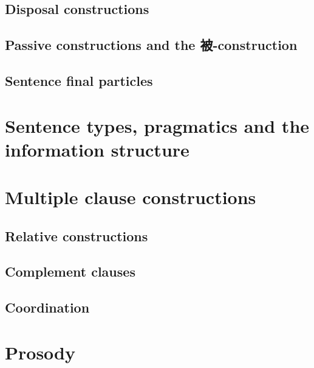 \documentclass[UTF8, a4paper, oneside, scheme=plain]{ctexbook}
\numberwithin{equation}{chapter}
\begin{document}


\chapter{Disposal constructions}\label{chap:disposal}

\chapter{Passive constructions and the 被-construction}\label{chap:passive}



\chapter{Sentence final particles}





\part{Sentence types, pragmatics and the information structure}%

\part{Multiple clause constructions}

\chapter{Relative constructions}\label{chap:relative}

\chapter{Complement clauses}\label{chap:comp-clause}

\chapter{Coordination}

\part{Prosody}
\end{document}
